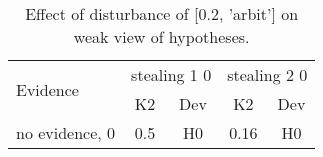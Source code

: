 \begin{table}\begin{tabular}{l|cc|cc}\toprule\multirow{2}{*}{Evidence} & \multicolumn{2}{c}{stealing 1 0}& \multicolumn{2}{c}{stealing 2 0}\\& {K2} & {Dev}& {K2} & {Dev}\\\midrule
no evidence, 0 & \cellcolor{Bittersweet}0.5&\cellcolor{Bittersweet}H0&\cellcolor{Bittersweet}0.16&\cellcolor{Bittersweet}H0\\\bottomrule\end{tabular}\caption{Effect of disturbance of [0.2, 'arbit'] on weak view of hypotheses.}\end{table}